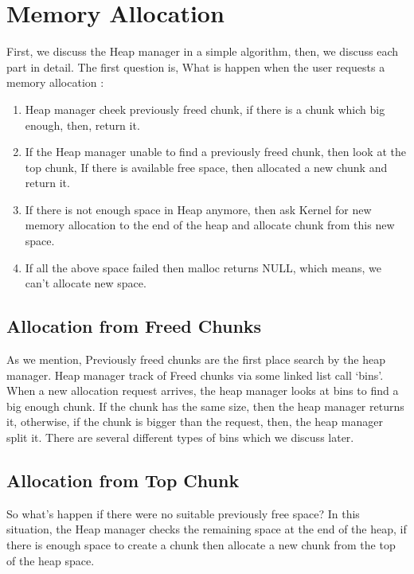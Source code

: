 \documentclass{masterthesis}
\begin{document}
\section{Memory Allocation}
 First, we discuss the Heap manager in a simple algorithm, then, we discuss each part in detail. The first question is, What is happen when the user requests a memory allocation : 
\begin{enumerate}
	\item Heap manager cheek previously freed chunk, if there is a chunk which big enough, then, return it.
	\item If the Heap manager unable to find a previously freed chunk, then look at the top chunk, If there is available free space, then allocated a new chunk and return it.
	\item If there is not enough space in Heap anymore, then ask Kernel for new memory allocation to the end of the heap and allocate chunk from this new space.
	\item If all the above space failed then malloc returns NULL, which means, we can’t allocate new space.
\end{enumerate}

\subsection{Allocation from Freed Chunks}
As we mention, Previously freed chunks are the first place search by the heap manager. Heap manager track of Freed chunks via some linked list call ‘bins’. When a new allocation request arrives, the heap manager looks at bins to find a big enough chunk. If the chunk has the same size, then the heap manager returns it, otherwise, if the chunk is bigger than the request, then, the heap manager split it. There are several different types of bins which we discuss later.

\subsection{Allocation from Top Chunk}
So what’s happen if there were no suitable previously free space? In this situation, the Heap manager checks the remaining space at the end of the heap, if there is enough space to create a chunk then allocate a new chunk from the top of the heap space. 
\end{document}

